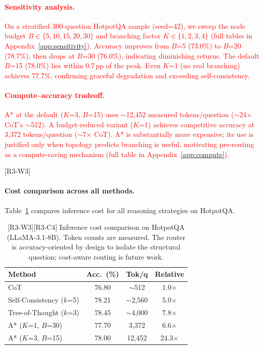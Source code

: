 \documentclass[11pt]{article}
\begin{document}
\textcolor{red}{\paragraph{Sensitivity analysis.}
On a stratified 300-question HotpotQA sample (seed=42), we sweep the node budget $B \in \{5,10,15,20,30\}$ and branching factor $K \in \{1,2,3,4\}$ (full tables in Appendix~\ref{app:sensitivity}). Accuracy improves from $B$=5 (73.0\%) to $B$=20 (78.7\%), then drops at $B$=30 (76.0\%), indicating diminishing returns. The default $B$=15 (78.0\%) lies within 0.7\,pp of the peak. Even $K$=1 (no real branching) achieves 77.7\%, confirming graceful degradation and exceeding self-consistency.}

\textcolor{red}{\paragraph{Compute--accuracy tradeoff.}
A* at the default ($K$=3, $B$=15) uses $\sim$12,452 measured tokens/question ($\sim$24$\times$ CoT's $\sim$512). A budget-reduced variant ($K$=1) achieves competitive accuracy at 3,372 tokens/question ($\sim$7$\times$ CoT). A* is substantially more expensive; its use is justified only when topology predicts branching is useful, motivating pre-routing as a compute-saving mechanism (full table in Appendix~\ref{app:compute}).}

\textcolor{reviewerpurple}{[R3-W3] \paragraph{Cost comparison across all methods.} Table~\ref{tab:cost_comparison} compares inference cost for all reasoning strategies on HotpotQA.}

\textcolor{reviewerpurple}{
\begin{table}[h]
\centering
\small
\begin{tabular}{lccc}
\toprule
\textbf{Method} & \textbf{Acc.\ (\%)} & \textbf{Tok/q} & \textbf{Relative} \\
\midrule
CoT & 76.80 & $\sim$512 & 1.0$\times$ \\
Self-Consistency ($k$=5) & 78.21 & $\sim$2,560 & 5.0$\times$ \\
Tree-of-Thought ($k$=3) & 78.45 & $\sim$4,000 & 7.8$\times$ \\
A* ($K$=1, $B$=30) & 77.70 & 3,372 & 6.6$\times$ \\
A* ($K$=3, $B$=15) & 78.00 & 12,452 & 24.3$\times$ \\
\bottomrule
\end{tabular}
\caption{[R3-W3][R3-C4] Inference cost comparison on HotpotQA (LLaMA-3.1-8B). Token counts are measured. The router is accuracy-oriented by design to isolate the structural question; cost-aware routing is future work.}
\label{tab:cost_comparison}
\end{table}}
\end{document}
